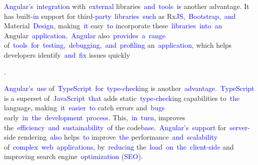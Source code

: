 \documentclass{article}
\begin{document}
\begin{tcolorbox}[colframe=black,colback=white]
{}\textcolor{blue}{Angular}\textcolor{blue}{'s}\textcolor{blue}{~integration} with\textcolor{blue}{~external} libraries\textcolor{blue}{~and}\textcolor{blue}{~tools}\textcolor{blue}{~is} another advantage\textcolor{blue}{.} It has built\textcolor{blue}{-in} support for third\textcolor{blue}{-party}\textcolor{blue}{~libraries}\textcolor{blue}{~such} as Rx\textcolor{blue}{JS}\textcolor{blue}{,}\textcolor{blue}{~Bootstrap}\textcolor{blue}{,}\textcolor{blue}{~and} Material\textcolor{blue}{~Design}, making\textcolor{blue}{~it} easy\textcolor{blue}{~to} incorporate these\textcolor{blue}{~libraries}\textcolor{blue}{~into}\textcolor{blue}{~an} Angular\textcolor{blue}{~application}\textcolor{blue}{.}\textcolor{blue}{~Angular} also\textcolor{blue}{~provides}\textcolor{blue}{~a}\textcolor{blue}{~range} of\textcolor{blue}{~tools}\textcolor{blue}{~for}\textcolor{blue}{~testing}\textcolor{blue}{,}\textcolor{blue}{~debugging}\textcolor{blue}{,}\textcolor{blue}{~and}\textcolor{blue}{~profiling} an\textcolor{blue}{~application}\textcolor{blue}{,} which helps developers identify\textcolor{blue}{~and}\textcolor{blue}{~fix} issues quickly\textcolor{blue}{.

}\textcolor{blue}{Angular}\textcolor{blue}{'s}\textcolor{blue}{~use} of\textcolor{blue}{~TypeScript}\textcolor{blue}{~for}\textcolor{blue}{~type}\textcolor{blue}{-check}ing is another\textcolor{blue}{~advantage}.\textcolor{blue}{~TypeScript} is a superset of\textcolor{blue}{~JavaScript}\textcolor{blue}{~that} adds static\textcolor{blue}{~type}\textcolor{blue}{-check}ing capabilities to\textcolor{blue}{~the} language, making\textcolor{blue}{~it}\textcolor{blue}{~easier}\textcolor{blue}{~to} catch errors and\textcolor{blue}{~bugs} early\textcolor{blue}{~in}\textcolor{blue}{~the}\textcolor{blue}{~development}\textcolor{blue}{~process}\textcolor{blue}{.} This\textcolor{blue}{,}\textcolor{blue}{~in}\textcolor{blue}{~turn}\textcolor{blue}{,} improves the\textcolor{blue}{~efficiency}\textcolor{blue}{~and}\textcolor{blue}{~sustainability}\textcolor{blue}{~of} the code\textcolor{blue}{base}.\textcolor{blue}{~Angular}\textcolor{blue}{'s}\textcolor{blue}{~support} for\textcolor{blue}{~server}-side rendering\textcolor{blue}{~also} helps\textcolor{blue}{~to} improve\textcolor{blue}{~the} performance\textcolor{blue}{~and}\textcolor{blue}{~scalability} of\textcolor{blue}{~complex}\textcolor{blue}{~web}\textcolor{blue}{~applications}\textcolor{blue}{,} by\textcolor{blue}{~reducing} the\textcolor{blue}{~load}\textcolor{blue}{~on}\textcolor{blue}{~the}\textcolor{blue}{~client}\textcolor{blue}{-side} and improving search engine\textcolor{blue}{~optimization} (\textcolor{blue}{SEO}\textcolor{blue}{).} 


\end{tcolorbox}
\end{document}
